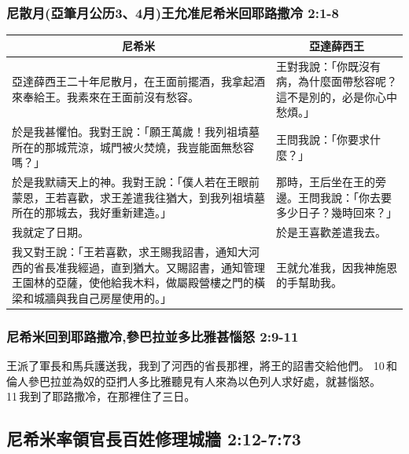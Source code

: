 \subsubsection{尼散月(亞筆月公历3、4月)王允准尼希米回耶路撒冷 2:1-8}
\begin{table}[H]
\centering 
\begin{tabular}{p{10.5cm}|p{6.5cm}}\hline\hline
\multicolumn{1}{c|}{尼希米}&\multicolumn{1}{c}{亞達薛西王}\\\hline
亞達薛西王二十年尼散月，在王面前擺酒，我拿起酒來奉給王。我素來在王面前沒有愁容。 &王對我說：「你既沒有病，為什麼面帶愁容呢？這不是別的，必是你心中愁煩。」\\\hline
於是我甚懼怕。我對王說：「願王萬歲！我列祖墳墓所在的那城荒涼，城門被火焚燒，我豈能面無愁容嗎？」&王問我說：「你要求什麼？」\\\hline
於是我默禱天上的神。我對王說：「僕人若在王眼前蒙恩，王若喜歡，求王差遣我往猶大，到我列祖墳墓所在的那城去，我好重新建造。」&那時，王后坐在王的旁邊。王問我說：「你去要多少日子？幾時回來？」\\\hline
我就定了日期。&於是王喜歡差遣我去。\\\hline
我又對王說：「王若喜歡，求王賜我詔書，通知大河西的省長准我經過，直到猶大。又賜詔書，通知管理王園林的亞薩，使他給我木料，做屬殿營樓之門的橫梁和城牆與我自己房屋使用的。」&王就允准我，因我神施恩的手幫助我。\\\hline
\end{tabular}
\end{table}


\subsubsection{尼希米回到耶路撒冷,參巴拉並多比雅甚惱怒 2:9-11}
王派了軍長和馬兵護送我，我到了河西的省長那裡，將王的詔書交給他們。 10 和倫人參巴拉並為奴的亞捫人多比雅聽見有人來為以色列人求好處，就甚惱怒。 11 我到了耶路撒冷，在那裡住了三日。

\subsection{尼希米率領官長百姓修理城牆 2:12-7:73}
